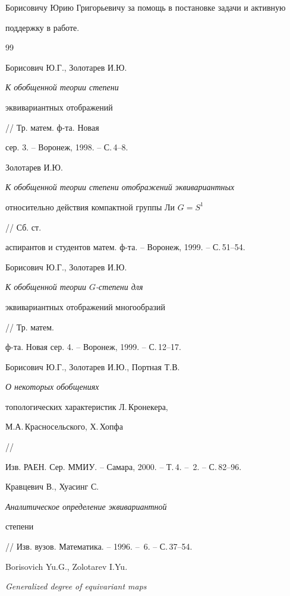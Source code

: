 Борисовичу Юрию Григорьевичу за помощь в постановке задачи и активную 


поддержку в работе. 


 


 


 


 


\begin{thebibliography}{99} 


 




Борисович Ю.Г., Золотарев И.Ю. {\em К обобщенной теории степени 


эквивариантных отображений} // Тр. матем. ф-та. Новая 


сер. 3. -- Воронеж, 1998. -- С.\,4--8. 




Золотарев И.Ю. {\em К обобщенной теории степени отображений эквивариантных 


относительно действия компактной группы Ли $G=S^1$} // Сб. ст. 


аспирантов и студентов матем. ф-та. -- Воронеж, 1999. -- С.\,51--54. 




Борисович Ю.Г., Золотарев И.Ю. {\em К обобщенной теории $G$-степени для 


эквивариантных отображений многообразий} // Тр. матем. 


ф-та. Новая сер. 4. -- Воронеж, 1999. -- С.\,12--17. 




Борисович Ю.Г., Золотарев И.Ю., Портная Т.В. {\em О некоторых обобщениях 


топологических характеристик Л.\,Кронекера, 


М.А.\,Красносельского, Х.\,Хопфа} // 


Изв. РАЕН. Сер. ММИУ. -- Самара, 2000. -- Т.\,4. -- \No\,2. -- С.\,82--96. 




Кравцевич В., Хуасинг С. {\em Аналитическое определение эквивариантной 


степени} // Изв. вузов. Математика. -- 1996. -- \No\,6. -- С.\,37--54. 




Borisovich Yu.G., Zolotarev I.Yu. 


{\em Generalized degree of equivariant maps} 



\end{thebibliography}
